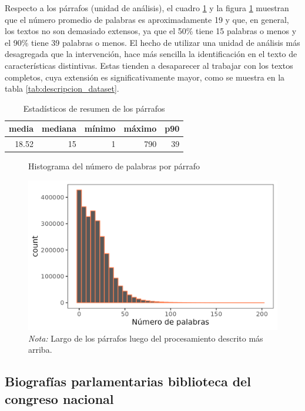 \documentclass[
  12pt,
]{article}
\begin{document}
Respecto a los párrafos (unidad de análisis), el cuadro
\ref{tab:descripcion_parrafos} y la figura
\ref{plot_descripcion_parrafos} muestran que el número promedio de
palabras es aproximadamente 19 y que, en general, los textos no son
demasiado extensos, ya que el 50\% tiene 15 palabras o menos y el 90\%
tiene 39 palabras o menos. El hecho de utilizar una unidad de análisis
más desagregada que la intervención, hace más sencilla la identificación
en el texto de características distintivas. Estas tienden a desaparecer
al trabajar con los textos completos, cuya extensión es
significativamente mayor, como se muestra en la tabla
\ref{tab:descripcion_dataset}.

\begin{table}[H]

\caption{\label{tab:descripcion_parrafos}Estadísticos de resumen de los párrafos}
\centering
\begin{tabular}[t]{rrrrr}
\toprule
media & mediana & mínimo & máximo & p90\\
\midrule
18.52 & 15 & 1 & 790 & 39\\
\bottomrule
\end{tabular}
\end{table}

\begin{figure}[H]
\centering
\large
\caption{Histograma del número de palabras por párrafo}
\label{plot_descripcion_parrafos}
\includegraphics[width = 0.5 \textwidth]{cuadros_tesis/plot_hist_descripcion_parrafos.png}
 \caption*{\footnotesize{\textit{Nota:} Largo de los párrafos luego del procesamiento descrito más arriba.}}
\normalsize
\end{figure}

\hypertarget{biografuxedas-parlamentarias-biblioteca-del-congreso-nacional}{%
\subsection{Biografías parlamentarias biblioteca del congreso
nacional}\label{biografuxedas-parlamentarias-biblioteca-del-congreso-nacional}}
\end{document}
